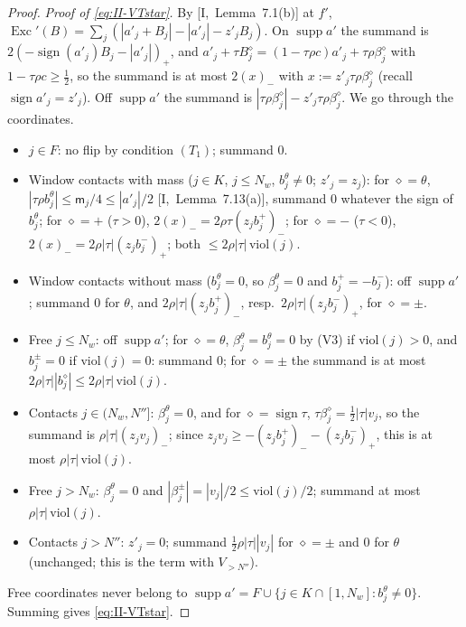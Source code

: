 \documentclass[10pt]{amsart}
\theoremstyle{definition}
\theoremstyle{remark}
\newcommand{\supp}{\operatorname{supp}}
\newcommand{\sgn}{\operatorname{sign}}
\newcommand{\Exc}{\operatorname{Exc}}
\begin{document}
\begin{proof}
\emph{Proof of \eqref{eq:II-VTstar}.}  By [I,~Lemma~7.1(b)] at $f'$,
$\Exc'(B)=\sum_j(|a'_j+B_j|-|a'_j|-z'_jB_j)$.  On $\supp a'$ the summand is
$2(-\sgn(a'_j)B_j-|a'_j|)_+$, and $a'_j+\tau B^\diamond_j=(1-\tau\rho c)a'_j+
\tau\rho\beta^\diamond_j$ with $1-\tau\rho c\ge\frac12$, so the summand is at
most $2(x)_-$ with $x:=z'_j\tau\rho\beta^\diamond_j$ (recall $\sgn a'_j=z'_j$).
Off $\supp a'$ the summand is $|\tau\rho\beta^\diamond_j|-z'_j\tau\rho
\beta^\diamond_j$.  We go through the coordinates.
\begin{itemize}
\item $j\in F$: no flip by condition $(T_1)$; summand $0$.
\item Window contacts with mass ($j\in K$, $j\le N_w$, $b^\theta_j\ne0$;
$z'_j=z_j$): for $\diamond=\theta$, $|\tau\rho b^\theta_j|\le\mathsf m_j/4\le
|a'_j|/2$ [I,~Lemma~7.13(a)], summand $0$ whatever the sign of $b^\theta_j$;
for $\diamond=+$ ($\tau>0$), $2(x)_-=2\rho\tau(z_jb^+_j)_-$; for $\diamond=-$
($\tau<0$), $2(x)_-=2\rho|\tau|(z_jb^-_j)_+$; both $\le2\rho|\tau|\,
\mathrm{viol}(j)$.
\item Window contacts without mass ($b^\theta_j=0$, so $\beta^\theta_j=0$ and
$b^+_j=-b^-_j$): off $\supp a'$; summand $0$ for $\theta$, and
$2\rho|\tau|(z_jb^+_j)_-$, resp.\ $2\rho|\tau|(z_jb^-_j)_+$, for $\diamond=\pm$.
\item Free $j\le N_w$: off $\supp a'$; for $\diamond=\theta$,
$\beta^\theta_j=b^\theta_j=0$ by (V3) if $\mathrm{viol}(j)>0$, and $b^\pm_j=0$
if $\mathrm{viol}(j)=0$: summand $0$; for $\diamond=\pm$ the summand is at
most $2\rho|\tau||b^\diamond_j|\le2\rho|\tau|\,\mathrm{viol}(j)$.
\item Contacts $j\in(N_w,N'']$: $\beta^\theta_j=0$, and for $\diamond=\sgn\tau$,
$\tau\beta^\diamond_j=\frac12|\tau|v_j$, so the summand is $\rho|\tau|
(z_jv_j)_-$; since $z_jv_j\ge-(z_jb^+_j)_--(z_jb^-_j)_+$, this is at most
$\rho|\tau|\,\mathrm{viol}(j)$.
\item Free $j>N_w$: $\beta^\theta_j=0$ and $|\beta^\pm_j|=|v_j|/2\le
\mathrm{viol}(j)/2$; summand at most $\rho|\tau|\,\mathrm{viol}(j)$.
\item Contacts $j>N''$: $z'_j=0$; summand $\frac12\rho|\tau||v_j|$ for
$\diamond=\pm$ and $0$ for $\theta$ (unchanged; this is the term with
$V_{>N''}$).
\end{itemize}
Free coordinates never belong to $\supp a'=F\cup\{j\in K\cap[1,N_w]:
b^\theta_j\ne0\}$.  Summing gives \eqref{eq:II-VTstar}.


\end{proof}
\end{document}
